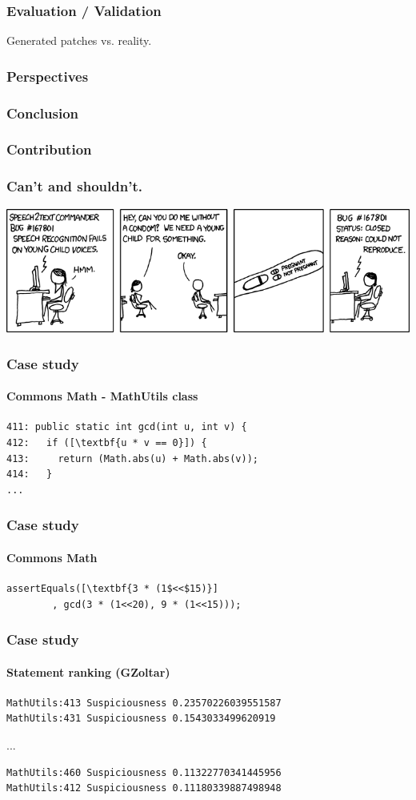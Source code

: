 \documentclass{beamer}
\begin{document}
  \frame
  {
    \frametitle{Evaluation / Validation}
    Generated patches vs. reality.
  }
  
  \frame
  {
    \frametitle{Perspectives}
    
  }
  
  \frame
  {
    \frametitle{Conclusion}
    
  }

  \frame
  {
    \frametitle{Contribution}
    
  }
  
 \frame
  {
    \frametitle{Can't and shouldn't.}
\includegraphics[width=.8\paperwidth]{cnr}

}



 \begin{frame}[fragile]
    \frametitle{Case study}
      \framesubtitle{Commons Math - MathUtils class}
\begin{lstlisting}[escapeinside=\[\]]
411: public static int gcd(int u, int v) {
412:   if ([\textbf{u * v == 0}]) {
413:     return (Math.abs(u) + Math.abs(v));
414:   }
...
\end{lstlisting}
\end{frame}

 \begin{frame}[fragile]
    \frametitle{Case study}
      \framesubtitle{Commons Math}
        \begin{lstlisting}[escapeinside=\[\]]
assertEquals([\textbf{3 * (1$<<$15)}]
        , gcd(3 * (1<<20), 9 * (1<<15)));
	\end{lstlisting}
\end{frame}

 \begin{frame}[fragile]
    \frametitle{Case study}
      \framesubtitle{Statement ranking (GZoltar)}
\begin{verbatim}
MathUtils:413 Suspiciousness 0.23570226039551587
MathUtils:431 Suspiciousness 0.1543033499620919
\end{verbatim}
...
\begin{verbatim}
MathUtils:460 Suspiciousness 0.11322770341445956
MathUtils:412 Suspiciousness 0.11180339887498948
\end{verbatim}
\end{frame}
\end{document}

